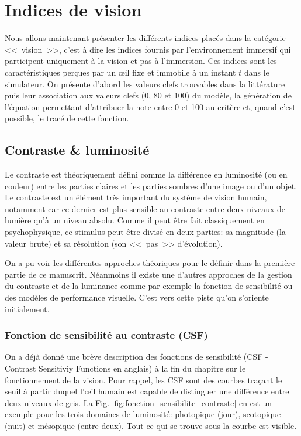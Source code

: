 \chapter{Indices de vision}
	\par Nous allons maintenant présenter les différents indices placés dans la catégorie <<~vision~>>, c'est à dire les indices fournis par l'environnement immersif qui participent uniquement à la vision et pas à l'immersion. Ces indices sont les caractéristiques perçues par un œil fixe et immobile à un instant $t$ dans le simulateur. On présente d'abord les valeurs clefs trouvables dans la littérature puis leur association aux valeurs clefs (0, 80 et 100) du modèle, la génération de l'équation permettant d'attribuer la note entre 0 et 100 au critère et, quand c'est possible, le tracé de cette fonction.
	
	\section{Contraste \& luminosité}
	\par Le contraste est théoriquement défini comme la différence en luminosité (ou en couleur) entre les parties claires et les parties sombres d'une image ou d'un objet. Le contraste est un élément très important du système de vision humain, notamment car ce dernier est plus sensible au contraste entre deux niveaux de lumière qu'à un niveau absolu. Comme il peut être fait classiquement en psychophysique, ce stimulus peut être divisé en deux parties: sa magnitude (la valeur brute) et sa résolution (son <<~pas~>> d'évolution).
	
	\par On a pu voir les différentes approches théoriques pour le définir dans la première partie de ce manuscrit. Néanmoins il existe une d'autres approches de la gestion du contraste et de la luminance comme par exemple la fonction de sensibilité ou des modèles de performance visuelle. C'est vers cette piste qu'on s'oriente initialement.
	
	\subsection{Fonction de sensibilité au contraste (CSF)}
	\par On a déjà donné une brève description des fonctions de sensibilité (CSF - Contrast Sensitiviy Functions en anglais) à la fin du chapitre sur le fonctionnement de la vision. Pour rappel, les CSF sont des courbes traçant le seuil à partir duquel l'œil humain est capable de distinguer une différence entre deux niveaux de gris. La Fig. \ref{fig:fonction_sensibilite_contraste} en est un exemple pour les trois domaines de luminosité: photopique (jour), scotopique (nuit) et mésopique (entre-deux). Tout ce qui se trouve sous la courbe est visible.
	
